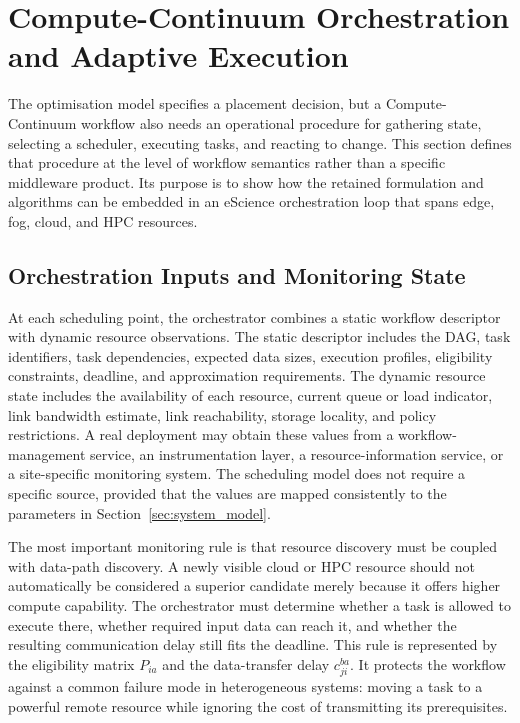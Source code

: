 \section{Compute-Continuum Orchestration and Adaptive Execution}
\label{sec:orchestration}

The optimisation model specifies a placement decision, but a Compute-Continuum workflow also needs an operational procedure for gathering state, selecting a scheduler, executing tasks, and reacting to change. This section defines that procedure at the level of workflow semantics rather than a specific middleware product. Its purpose is to show how the retained formulation and algorithms can be embedded in an eScience orchestration loop that spans edge, fog, cloud, and HPC resources.

\subsection{Orchestration Inputs and Monitoring State}

At each scheduling point, the orchestrator combines a static workflow descriptor with dynamic resource observations. The static descriptor includes the DAG, task identifiers, task dependencies, expected data sizes, execution profiles, eligibility constraints, deadline, and approximation requirements. The dynamic resource state includes the availability of each resource, current queue or load indicator, link bandwidth estimate, link reachability, storage locality, and policy restrictions. A real deployment may obtain these values from a workflow-management service, an instrumentation layer, a resource-information service, or a site-specific monitoring system. The scheduling model does not require a specific source, provided that the values are mapped consistently to the parameters in Section~\ref{sec:system_model}.

The most important monitoring rule is that resource discovery must be coupled with data-path discovery. A newly visible cloud or HPC resource should not automatically be considered a superior candidate merely because it offers higher compute capability. The orchestrator must determine whether a task is allowed to execute there, whether required input data can reach it, and whether the resulting communication delay still fits the deadline. This rule is represented by the eligibility matrix $P_{ia}$ and the data-transfer delay $c_{ji}^{ba}$. It protects the workflow against a common failure mode in heterogeneous systems: moving a task to a powerful remote resource while ignoring the cost of transmitting its prerequisites.

